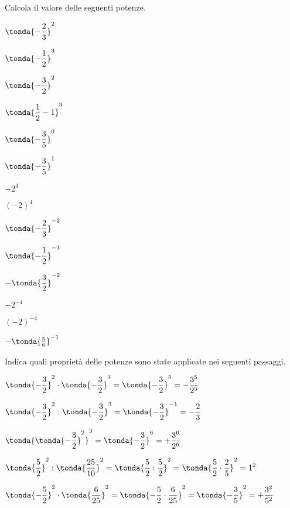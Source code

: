 \begin{esercizio}
 \label{ese:3.56}
Calcola il valore delle seguenti potenze.

\begin{htmulticols}{4}
\begin{enumeratees}
\spazielenx
 \item \(\tonda{-\dfrac{2}{3}}^2\)
 \item \(\tonda{-\dfrac{1}{2}}^3\)
 \item \(\tonda{-\dfrac{3}{2}}^2\)
 \item \(\tonda{\dfrac{1}{2}-1}^3\)
 \item \(\tonda{-\dfrac{3}{5}}^0\)
 \item \(\tonda{-\dfrac{3}{5}}^1\)
 \item \(-2^4\)
 \item \((-2)^4\)
 \item \(\tonda{-\dfrac{2}{3}}^{-2}\)
 \item \(\tonda{-\dfrac{1}{2}}^{-3}\)
 \item \(-\tonda{\dfrac{3}{2}}^{-2}\)
 \item \(-2^{-4}\)
 \item \((-2)^{-4}\)
 \item \(-\tonda{\frac{5}{6}}^{-1}\)
\end{enumeratees}
\end{htmulticols}
\end{esercizio}

\begin{esercizio}
 \label{ese:3.57}
Indica quali proprietà delle potenze sono state applicate nei seguenti 
passaggi.
\begin{enumeratees}
\spazielenx
 \item 
\(\displaystyle{\tonda{-\frac{3}{2}}^2\cdot\tonda{-\frac{3}{2}}^{3}=
\tonda{-\frac{3}{2}}^{5}=-\frac{3^5}{2^5}}\)
 \item 
\(\displaystyle{\tonda{-\frac{3}{2}}^2:\tonda{-\frac{3}{2}}^{3}=
  \tonda{-\frac{3}{2}}^{-1} = -\frac{2}{3}}\)
 \item 
\(\displaystyle{\tonda{\tonda{-\frac{3}{2}}^2}^3 =
  \tonda{-\frac{3}{2}}^{6} = +\frac{3^6}{2^6}}\)
 \item 
\(\displaystyle{\tonda{\frac{5}{2}}^2:\tonda{\frac{25}{10}}^2=
 \tonda{\frac{5}{2}:\frac{5}{2}}^2 =
\tonda{\frac{5}{2}\cdot\frac{2}{5}}^2 = 1^2}\)
 \item 
\(\displaystyle{\tonda{-\frac{5}{2}}^{2}\cdot\tonda{\frac{6}{25} }^{2}=
  \tonda{-\frac{5}{2} \cdot \frac{6}{25}}^{2}=
  \tonda{-\frac{3}{5}}^2 = +\frac{3^2}{5^2}}\)
\end{enumeratees}
\end{esercizio}

